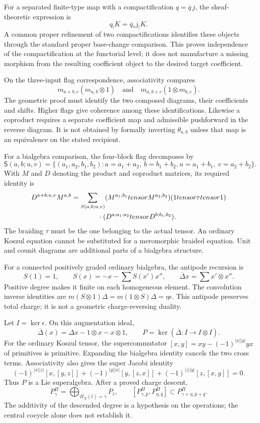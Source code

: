 For a separated finite-type map with a compactification
\(q=\overline q\,j\), the sheaf-theoretic expression is
\[
 q_!K=\overline q_*j_!K.
\]
A common proper refinement of two compactifications identifies
these objects through the standard proper base-change comparison.
This proves independence of the compactification at the functorial
level; it does not manufacture a missing morphism from the resulting
coefficient object to the desired target coefficient.

On the three-input flag correspondence, associativity compares
\[
 m_{a+b,c}(m_{a,b}\otimes1)
       \quad\text{and}\quad
 m_{a,b+c}(1\otimes m_{b,c}).
\]
The geometric proof must identify the two composed diagrams,
their coefficients and shifts. Higher flags give coherence among
these identifications. Likewise a coproduct requires a separate
coefficient map and admissible pushforward in the reverse diagram.
It is not obtained by formally inverting \(\theta_{a,b}\) unless
that map is an equivalence on the stated recipient.

For a bialgebra comparison, the four-block flag decomposes by
\[
 \mathsf S(a,b;u,v)=
 \{(a_1,a_2,b_1,b_2):
   a=a_1+a_2,\ b=b_1+b_2,
   u=a_1+b_1,\ v=a_2+b_2\}.
\]
With \(M\) and \(D\) denoting the product and coproduct matrices,
its required identity is
\[
 \begin{split}
 D^{a+b;u,v}M^{a,b}
 =\sum_{\mathsf S(a,b;u,v)}
 &(M^{a_1,b_1}\otimes M^{a_2,b_2})
 (1\otimes\tau\otimes1)\\
 &\hspace{-1em}\cdot
 (D^{a;a_1,a_2}\otimes D^{b;b_1,b_2}).
 \end{split}
\]
The braiding \(\tau\) must be the one belonging to the actual
tensor. An ordinary Koszul equation cannot be substituted for a
meromorphic braided equation. Unit and counit diagrams are
additional parts of a bialgebra structure.

For a connected positively graded ordinary bialgebra, the antipode
recursion is
\[
 S(1)=1,\qquad S(x)=-x-\sum S(x')x'',
 \qquad\overline\Delta x=\sum x'\otimes x''.
\]
Positive degree makes it finite on each homogeneous element.
The convolution inverse identities are
\(m(S\otimes1)\Delta=m(1\otimes S)\Delta=\eta\epsilon\).
This antipode preserves total charge; it is not a geometric
charge-reversing duality.

Let \(I=\ker\epsilon\). On this augmentation ideal,
\[
 \overline\Delta(x)=\Delta x-1\otimes x-x\otimes1,
 \qquad P=\ker(\overline\Delta:I\to I\otimes I).
\]
For the ordinary Koszul tensor, the supercommutator
\( [x,y]=xy-(-1)^{|x||y|}yx \) of primitives is primitive.
Expanding the bialgebra identity cancels the two cross terms.
Associativity also gives the super Jacobi identity
\[
 (-1)^{|x||z|}[x,[y,z]]+
 (-1)^{|y||x|}[y,[z,x]]+
 (-1)^{|z||y|}[z,[x,y]]=0.
\]
Thus \(P\)
is a Lie superalgebra. After a proved charge descent,
\[
 P^\Pi_\gamma=
   \bigoplus_{\overline\Pi_X(\widehat c)=\gamma}P_{\widehat c},
 \qquad
 [P^\Pi_{\gamma,\bar p},P^\Pi_{\eta,\bar q}]
   \subset P^\Pi_{\gamma+\eta,\bar p+\bar q}.
\]
The additivity of the descended degree is a hypothesis on the
operations; the central cocycle alone does not establish it.

